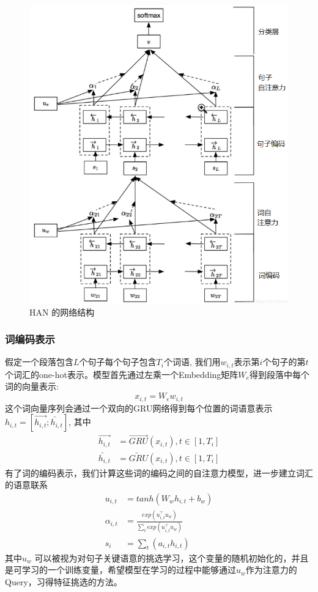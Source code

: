 \documentclass[twoside,a4paper,12pt]{book}%
\begin{document}
\begin{figure}[H]
\begin{center}
\includegraphics[width=5.6in]{figures/han1.png}
\caption{HAN 的网络结构}\label{fig:han1}
\end{center}
\end{figure}

\subsubsection{词编码表示}

假定一个段落包含$L$个句子每个句子包含$T_i$个词语, 我们用$w_{i,t}$表示第$i$个句子的第$t$个词汇的one-hot表示。模型首先通过左乘一个Embedding矩阵$W_e$得到段落中每个词的向量表示:
$$
x_{i,t} = W_ew_{i,t}
$$
这个词向量序列会通过一个双向的\gls{GRU}网络得到每个位置的词语意表示$h_{i,t}=[\overrightarrow{h_{i,t}};\overleftarrow{h_{i,t}}]$, 其中
$$
\begin{aligned}
\overrightarrow{h_{i,t}} &= \overrightarrow{GRU}(x_{i,t}),t\in [1,T_i]\\
\overleftarrow{h_{i,t}} &=\overleftarrow{GRU}(x_{i,t}),t\in [1,T_i]
\end{aligned}
$$
有了词的编码表示，我们计算这些词的编码之间的自注意力模型，进一步建立词汇的语意联系
$$
\begin{aligned}
u_{i,t} &= tanh(W_{w}h_{i,t} + b_w)\\
\alpha_{i,t} &= \frac{
	exp(u_{i,t}^\top u_w)
}{\sum_{t}exp(u_{i,t}^\top u_w)}\\
s_i &= \sum_{t}(a_{i,t}h_{i,t})  
\end{aligned}
$$
其中$u_w$ 可以被视为对句子关键语意的挑选学习，这个变量的随机初始化的，并且是可学习的一个训练变量，希望模型在学习的过程中能够通过$u_w$作为注意力的Query，习得特征挑选的方法。
\end{document}
